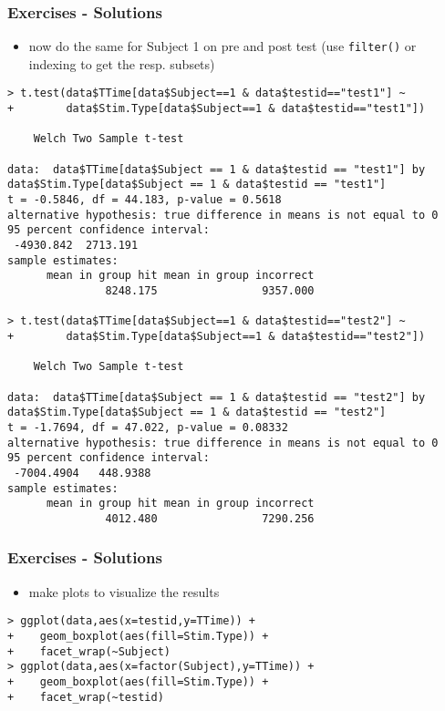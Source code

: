 \begin{frame}\frametitle{Exercises - Solutions}
  \begin{itemize}
  \item now do the same for Subject 1 on pre and post test (use \texttt{filter()} or indexing to get the resp. subsets)
  \end{itemize}\tiny
\begin{verbatim}
> t.test(data$TTime[data$Subject==1 & data$testid=="test1"] ~
+        data$Stim.Type[data$Subject==1 & data$testid=="test1"])

	Welch Two Sample t-test

data:  data$TTime[data$Subject == 1 & data$testid == "test1"] by data$Stim.Type[data$Subject == 1 & data$testid == "test1"]
t = -0.5846, df = 44.183, p-value = 0.5618
alternative hypothesis: true difference in means is not equal to 0
95 percent confidence interval:
 -4930.842  2713.191
sample estimates:
      mean in group hit mean in group incorrect 
               8248.175                9357.000 

> t.test(data$TTime[data$Subject==1 & data$testid=="test2"] ~
+        data$Stim.Type[data$Subject==1 & data$testid=="test2"])

	Welch Two Sample t-test

data:  data$TTime[data$Subject == 1 & data$testid == "test2"] by data$Stim.Type[data$Subject == 1 & data$testid == "test2"]
t = -1.7694, df = 47.022, p-value = 0.08332
alternative hypothesis: true difference in means is not equal to 0
95 percent confidence interval:
 -7004.4904   448.9388
sample estimates:
      mean in group hit mean in group incorrect 
               4012.480                7290.256 

\end{verbatim}
\end{frame}

\begin{frame}[fragile]\frametitle{Exercises - Solutions}
  \begin{itemize}
  \item make plots to visualize the results
  \end{itemize}\footnotesize
\begin{verbatim}
> ggplot(data,aes(x=testid,y=TTime)) +
+    geom_boxplot(aes(fill=Stim.Type)) +
+    facet_wrap(~Subject)
> ggplot(data,aes(x=factor(Subject),y=TTime)) +
+    geom_boxplot(aes(fill=Stim.Type)) +
+    facet_wrap(~testid)
\end{verbatim}
\end{frame}


